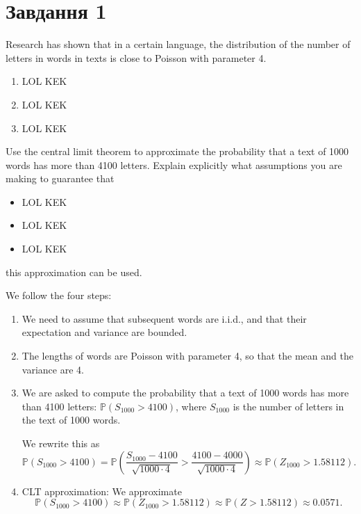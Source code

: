 \section{Завдання 1}

\begin{question}
    Research has shown that in a certain language, the distribution of the number of letters in words in texts is close to Poisson with parameter 4. 
        
    \begin{enumerate}
        \item LOL KEK
        \item LOL KEK
        \item LOL KEK
    \end{enumerate}
        
    Use the central limit theorem to approximate the probability that a text of 1000 words has more than 4100 letters. Explain explicitly what assumptions you are making to guarantee that
    \begin{itemize}
        \item LOL KEK
        \item LOL KEK
        \item LOL KEK
    \end{itemize}
    this approximation can be used.
\end{question}

\begin{answer}
    We follow the four steps:
    \begin{enumerate}
        \item We need to assume that subsequent words are i.i.d., and that their expectation and variance are bounded.
        
        \item The lengths of words are Poisson with parameter 4, so that the mean and the variance are 4.
        
        \item We are asked to compute the probability that a text of 1000 words has more than 4100 letters: $\mathbb{P}(S_{1000} > 4100)$, where $S_{1000}$ is the number of letters in the text of 1000 words. 
        
        We rewrite this as
        \begin{equation*}
            \mathbb{P}(S_{1000} > 4100) = \mathbb{P}\left( \frac{S_{1000} - 4100}{\sqrt{1000 \cdot 4}} > \frac{4100 - 4000}{\sqrt{1000 \cdot 4}} \right) \approx \mathbb{P}(Z_{1000} > 1.58112).
        \end{equation*}
        
        \item CLT approximation: We approximate
        \begin{equation*}
            \mathbb{P}(S_{1000} > 4100) \approx \mathbb{P}(Z_{1000} > 1.58112) \approx \mathbb{P}(Z > 1.58112) \approx 0.0571.
        \end{equation*}
    \end{enumerate}
\end{answer}